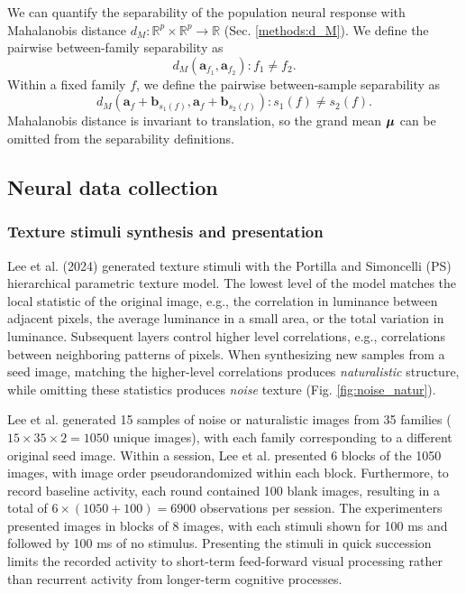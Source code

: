 \documentclass[draft]{cmustatproposal} %
\begin{document}
We can quantify the separability of the population neural response with Mahalanobis distance \(d_M: \mathbb{R}^p \times \mathbb{R}^p \to \mathbb{R} \) (Sec. \ref{methods:d_M}). We define the pairwise between-family separability as 
\[ d_M \left( \mathbf{a}_{f_1}, \mathbf{a}_{f_2}  \right) :  f_1 \neq f_2. \]
Within a fixed family \( f \), we define the pairwise between-sample separability as
\[ d_M \left( \mathbf{a}_{f} + \mathbf{b}_{s_1(f)}, \mathbf{a}_{f} + \mathbf{b}_{s_2(f)}  \right) : s_1 (f) \neq s_2 (f). \]
Mahalanobis distance is invariant to translation, so the grand mean \( \boldsymbol{ \mu } \) can be omitted from the separability definitions.


\subsection{Neural data collection}

\subsubsection{Texture stimuli synthesis and presentation}

Lee et al. (2024) generated texture stimuli with the Portilla and Simoncelli (PS) hierarchical parametric texture model. The lowest level of the model matches the local statistic of the original image, e.g., the correlation in luminance between adjacent pixels, the average luminance in a small area, or the total variation in luminance. Subsequent layers control higher level correlations, e.g., correlations between neighboring patterns of pixels. 
When synthesizing new samples from a seed image, matching the higher-level correlations produces \textit{naturalistic} structure, while omitting these statistics produces \textit{noise} texture (Fig. \ref{fig:noise_natur}). 

Lee et al. generated 15 samples of noise or naturalistic images from 35 families (\(15 \times 35 \times 2 = 1050\) unique images), with each family corresponding to a different original seed image. Within a session, Lee et al. presented 6 blocks of the 1050 images, with image order pseudorandomized within each block. Furthermore, to record baseline activity, each round contained 100 blank images, resulting in a total of \( 6 \times (1050 + 100) = 6900 \) observations per session. The experimenters presented images in blocks of 8 images, with each stimuli shown for 100 ms and followed by 100 ms of no stimulus. Presenting the stimuli in quick succession limits the recorded activity to short-term feed-forward visual processing rather than recurrent activity from longer-term cognitive processes. 
\end{document}
